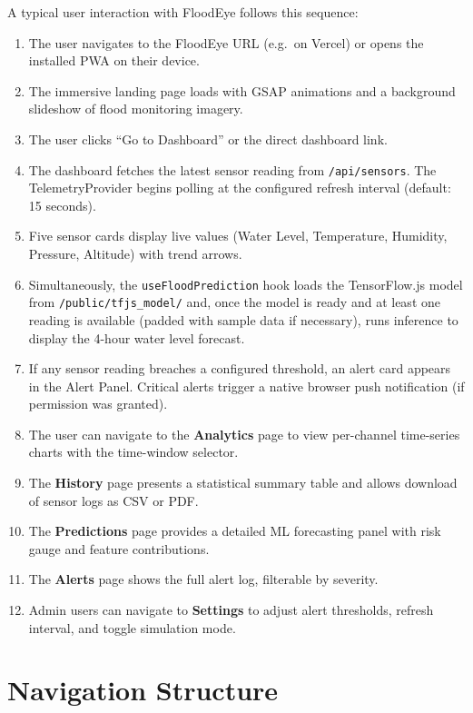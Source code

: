 A typical user interaction with FloodEye follows this sequence:

\begin{enumerate}[leftmargin=1.5em]
  \item The user navigates to the FloodEye URL (e.g.\ on Vercel) or opens the installed PWA on their device.
  \item The immersive landing page loads with GSAP animations and a background slideshow of flood monitoring imagery.
  \item The user clicks ``Go to Dashboard'' or the direct dashboard link.
  \item The dashboard fetches the latest sensor reading from \texttt{/\allowbreak{}api/\allowbreak{}sensors}. The TelemetryProvider begins polling at the configured refresh interval (default: 15 seconds).
  \item Five sensor cards display live values (Water Level, Temperature, Humidity, Pressure, Altitude) with trend arrows.
  \item Simultaneously, the \texttt{useFloodPrediction} hook loads the TensorFlow.js model from \texttt{/\allowbreak{}public/\allowbreak{}tfjs\_\allowbreak{}model/\allowbreak{}} and, once the model is ready and at least one reading is available (padded with sample data if necessary), runs inference to display the 4-hour water level forecast.
  \item If any sensor reading breaches a configured threshold, an alert card appears in the Alert Panel. Critical alerts trigger a native browser push notification (if permission was granted).
  \item The user can navigate to the \textbf{Analytics} page to view per-channel time-series charts with the time-window selector.
  \item The \textbf{History} page presents a statistical summary table and allows download of sensor logs as CSV or PDF.
  \item The \textbf{Predictions} page provides a detailed ML forecasting panel with risk gauge and feature contributions.
  \item The \textbf{Alerts} page shows the full alert log, filterable by severity.
  \item Admin users can navigate to \textbf{Settings} to adjust alert thresholds, refresh interval, and toggle simulation mode.
\end{enumerate}

\section{Navigation Structure}

